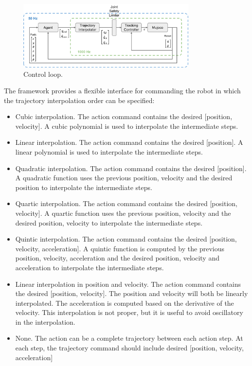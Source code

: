     \begin{figure}[H]
        \centering
        \label{fig:control_loop}
        \includegraphics[width=0.8\textwidth]{Images/control_paradigm}
        \caption{Control loop.}

    \end{figure}


    The framework provides a flexible interface for commanding the robot in which the trajectory interpolation order can be specified:
    \begin{itemize}
        \item Cubic interpolation. The action command contains the desired [position, velocity]. A cubic polynomial is used to interpolate the intermediate steps.
        \item Linear interpolation. The action command contains the desired [position]. A linear polynomial is used to interpolate the intermediate steps.
        \item Quadratic interpolation. The action command contains the desired [position]. A quadratic function uses the previous position, velocity and the desired position to interpolate the intermediate steps.
        \item Quartic interpolation. The action command contains the desired [position, velocity]. A quartic function uses the previous position, velocity and the desired position, velocity to interpolate the intermediate steps.
        \item Quintic interpolation. The action command contains the desired [position, velocity, acceleration]. A quintic function is computed by the previous position, velocity, acceleration and the desired position, velocity and acceleration to interpolate the intermediate steps.
        \item Linear interpolation in position and velocity. The action command contains the desired [position, velocity]. The position and velocity will both be linearly interpolated. The acceleration is computed based on the derivative of the velocity. This interpolation is not proper, but it is useful to avoid oscillatory in the interpolation.
        \item None. The action can be a complete trajectory between each action step. At each step, the trajectory command should include desired [position, velocity, acceleration]
    \end{itemize}

